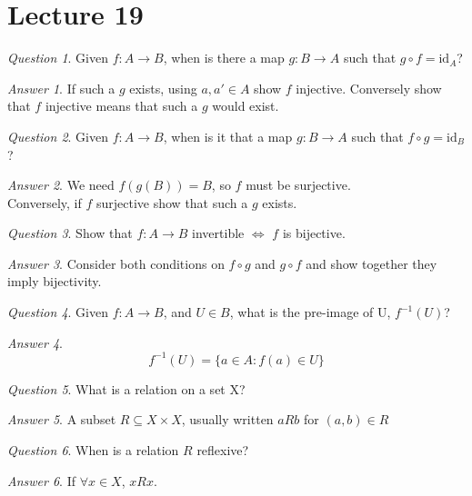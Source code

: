 \documentclass[]{article}
\theoremstyle{remark}
\theoremstyle{qnstyle}
\newtheorem{question}{Question}
\theoremstyle{answerstyle}
\newtheorem*{answer}{Answer}
\begin{document}
\section* {Lecture 19}

\begin{question}
    Given $f: A \to B$, when is there a map $g: B \to A$ such that 
    $g \circ f = \text{id}_A$?
\end{question}
\begin{answer}
    If such a $g$ exists, using $a, a' \in A$ show $f$ injective. Conversely show that
    $f$ injective means that such a $g$ would exist.
\end{answer}

\begin{question}
    Given $f:A \to B$, when is it that a map $g: B \to A$ such that 
    $f \circ g = \text{id}_B$?
\end{question}
\begin{answer}
    We need $f(g(B)) = B$, so $f$ must be surjective. \\
    Conversely, if $f$ surjective show that such a $g$ exists.
\end{answer}

\begin{question}
    Show that $f: A \to B$ invertible $\iff$ $f$ is bijective.
\end{question}
\begin{answer}
    Consider both conditions on $f \circ g$ and $g \circ f$ and show together
    they imply bijectivity.
\end{answer}

\begin{question}
    Given $f: A \to B$, and $U \in B$, what is the pre-image of U, $f^{-1}(U)$?
\end{question}
\begin{answer}
    $$f^{-1}(U) = \{a \in A: f(a) \in U \}$$
\end{answer}

\begin{question}
    What is a relation on a set X?
\end{question}
\begin{answer}
    A subset $R \subseteq X \times X$, usually written $aRb$ for $(a,b) \in R$
\end{answer}

\begin{question}
    When is a relation $R$ reflexive?
\end{question}
\begin{answer}
    If $\forall x \in X$, $xRx$.
\end{answer}
\end{document}

